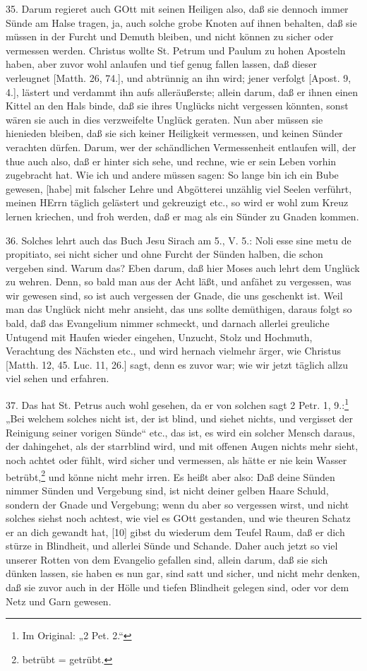 35. Darum regieret auch GOtt mit seinen Heiligen also, daß sie dennoch immer Sünde am Halse tragen, ja, auch solche grobe Knoten auf ihnen behalten, daß sie müssen in der Furcht und Demuth bleiben, und nicht können zu sicher oder vermessen werden. Christus wollte St. Petrum und Paulum zu hohen Aposteln haben, aber zuvor wohl anlaufen und tief genug fallen lassen, daß dieser verleugnet [Matth. 26, 74.], und abtrünnig an ihn wird; jener verfolgt [Apost. 9, 4.], lästert und verdammt ihn aufs alleräußerste; allein darum, daß er ihnen einen Kittel an den Hals binde, daß sie ihres Unglücks nicht vergessen könnten, sonst wären sie auch in dies verzweifelte Unglück geraten. Nun aber müssen sie hienieden bleiben, daß sie sich keiner Heiligkeit vermessen, und keinen Sünder verachten dürfen. Darum, wer der schändlichen Vermessenheit entlaufen will, der thue auch also, daß er hinter sich sehe, und rechne, wie er sein Leben vorhin zugebracht hat. Wie ich und andere müssen sagen: So lange bin ich ein Bube gewesen, [habe] mit falscher Lehre und Abgötterei unzählig viel Seelen verführt, meinen HErrn täglich gelästert und gekreuzigt etc., so wird er wohl zum Kreuz lernen kriechen, und froh werden, daß er mag als ein Sünder zu Gnaden kommen.

36. Solches lehrt auch das Buch Jesu Sirach am 5., V. 5.: Noli esse sine metu de propitiato, sei nicht sicher und ohne Furcht der Sünden halben, die schon vergeben sind. Warum das? Eben darum, daß hier Moses auch lehrt dem Unglück zu wehren. Denn, so bald man aus der Acht läßt, und anfähet zu vergessen, was wir gewesen sind, so ist auch vergessen der Gnade, die uns geschenkt ist. Weil man das Unglück nicht mehr ansieht, das uns sollte demüthigen, daraus folgt so bald, daß das Evangelium nimmer schmeckt, und darnach allerlei greuliche Untugend mit Haufen wieder eingehen, Unzucht, Stolz und Hochmuth, Verachtung des Nächsten etc., und wird hernach vielmehr ärger, wie Christus [Matth. 12, 45. Luc. 11, 26.] sagt, denn es zuvor war; wie wir jetzt täglich allzu viel sehen und erfahren.

37. Das hat St. Petrus auch wohl gesehen,
da er von solchen sagt 2 Petr. 1, 9.:\footnote{Im Original: „2 Pet. 2.“} „Bei welchem solches nicht ist, der ist blind, und siehet nichts, und vergisset der Reinigung seiner vorigen Sünde“ etc., das ist, es wird ein solcher Mensch daraus, der dahingehet, als der starrblind wird, und mit offenen Augen nichts mehr sieht, noch achtet oder fühlt, wird sicher und vermessen, als hätte er nie kein Wasser betrübt,\footnote{betrübt = getrübt.} und könne nicht mehr irren. Es heißt aber also: Daß deine Sünden nimmer Sünden und Vergebung sind, ist nicht deiner gelben Haare Schuld, sondern der Gnade und Vergebung; wenn du aber so vergessen wirst, und nicht solches siehst noch achtest, wie viel es GOtt gestanden, und wie theuren Schatz er an dich gewandt hat, [10] gibst du wiederum dem Teufel Raum, daß er dich stürze in Blindheit, und allerlei Sünde und Schande. Daher auch jetzt so viel unserer Rotten von dem Evangelio gefallen sind, allein darum, daß sie sich dünken lassen, sie haben es nun gar, sind satt und sicher, und nicht mehr denken, daß sie zuvor auch in der Hölle und tiefen Blindheit gelegen sind, oder vor dem Netz und Garn gewesen.

